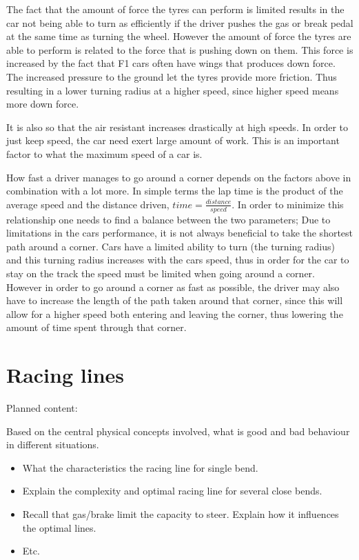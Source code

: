 The fact that the amount of force the tyres can perform is limited results in the car not being able to turn as efficiently if the driver pushes the gas or break pedal at the same time as turning the wheel. However the amount of force the tyres are able to perform is related to the force that is pushing down on them. This force is increased by the fact that F1 cars often have wings that produces down force. The increased pressure to the ground let the tyres provide more friction. Thus resulting in a lower turning radius at a higher speed, since higher speed means more down force.


It is also so that the air resistant increases drastically at high speeds. In order to just keep speed, the car need exert large amount of work. This is an important factor to what the maximum speed of a car is.

How fast a driver manages to go around a corner depends on the factors above in combination with a lot more. In simple terms the lap time is the product of the average speed and the distance driven, $time = \frac{distance}{speed}$. In order to minimize this relationship one needs to find a balance between the two parameters; Due to limitations in the cars performance, it is not always beneficial to take the shortest path around a corner. Cars have a limited ability to turn (the turning radius) and this turning radius increases with the cars speed, thus in order for the car to stay on the track the speed must be limited when going around a corner. However in order to go around a corner as fast as possible, the driver may also have to increase the length of the path taken around that corner, since this will allow for a higher speed both entering and leaving the corner, thus lowering the amount of time spent through that corner.

\section{Racing lines}
Planned content:

Based on the central physical concepts involved, what is good and bad behaviour in different situations. 
\begin{itemize}
    \item What the characteristics the racing line for single bend.
    \item Explain the complexity and optimal racing line for several close bends.
    \item Recall that gas/brake limit the capacity to steer. Explain how it influences the optimal lines.
    \item Etc.
\end{itemize}
\fi